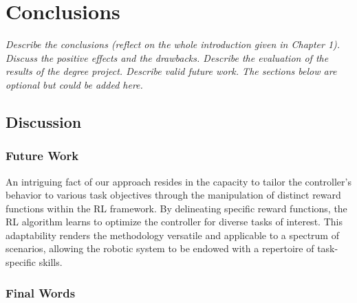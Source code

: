 \chapter{Conclusions}
\label{chap6}
\textit{Describe the conclusions (reflect on the whole introduction given in Chapter 1). Discuss the positive effects and the drawbacks. Describe the evaluation of the results of the degree project. Describe valid future work. The sections below are optional but could be added here.}

\section{Discussion}

\subsection{Future Work}

An intriguing fact of our approach resides in the capacity to tailor the controller's behavior to various task objectives through the manipulation of distinct reward functions within the RL framework. By delineating specific reward functions, the RL algorithm learns to optimize the controller for diverse tasks of interest. This adaptability renders the methodology versatile and applicable to a spectrum of scenarios, allowing the robotic system to be endowed with a repertoire of task-specific skills.
\subsection{Final Words}







